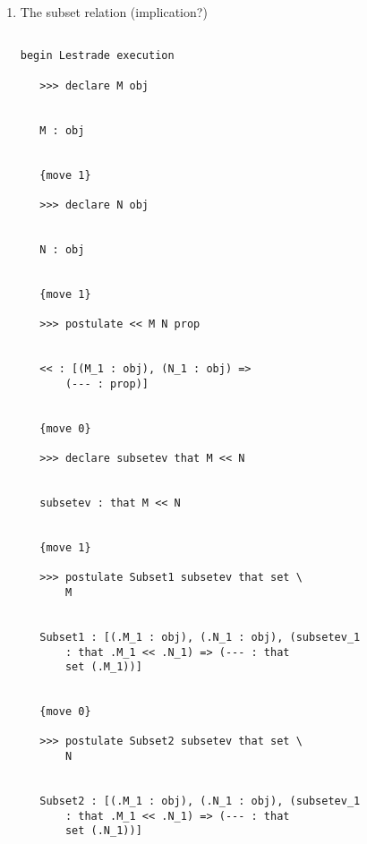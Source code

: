 \documentclass[12pt]{article}
\begin{document}
\begin{enumerate}
\begin{verbatim}
   >>> postulate E a b prop


   E : [(a_1 : obj), (b_1 : obj) => 
       (--- : prop)]


   {move 0}

   >>> postulate set b prop


   set : [(b_1 : obj) => (--- : prop)]


   {move 0}

   >>> declare memberdata that a E b


   memberdata : that a E b


   {move 1}

   >>> postulate Isset memberdata that set \
       b


   Isset : [(.a_1 : obj), (.b_1 : obj), (memberdata_1 
       : that .a_1 E .b_1) => (--- : that 
       set (.b_1))]


   {move 0}
end Lestrade execution

\end{verbatim}


\item  The subset relation (implication?)

\begin{verbatim}

begin Lestrade execution

   >>> declare M obj


   M : obj


   {move 1}

   >>> declare N obj


   N : obj


   {move 1}

   >>> postulate << M N prop


   << : [(M_1 : obj), (N_1 : obj) => 
       (--- : prop)]


   {move 0}

   >>> declare subsetev that M << N


   subsetev : that M << N


   {move 1}

   >>> postulate Subset1 subsetev that set \
       M


   Subset1 : [(.M_1 : obj), (.N_1 : obj), (subsetev_1 
       : that .M_1 << .N_1) => (--- : that 
       set (.M_1))]


   {move 0}

   >>> postulate Subset2 subsetev that set \
       N


   Subset2 : [(.M_1 : obj), (.N_1 : obj), (subsetev_1 
       : that .M_1 << .N_1) => (--- : that 
       set (.N_1))]



\end{verbatim}
\end{enumerate}
\end{document}
